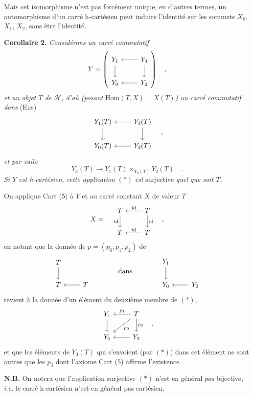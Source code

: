\documentclass[11pt]{article}
\newcommand{\printedpage}[1]{\if\relax\detokenize{#1}\relax\else\begingroup\reversemarginpar\marginnote{\footnotesize p.~#1}\endgroup\fi}
\newcommand{\msp}[1]{\marginnote{\footnotesize [#1]}}
\begin{document}
Mais cet isomorphisme n'est pas forcément unique, en d'autres termes, un automorphisme d'un carré h-cartésien peut induire l'identité sur les sommets $X_0$, $X_1$, $X_2$, sans être l'identité.

\printedpage{5}

\msp{page 6}
\textbf{Corollaire 2.} \textit{Considérons un carré commutatif}
\[
Y = \left(\begin{tikzcd}
Y_1 \ar[d] & Y_3 \ar[l] \ar[d] \\
Y_0 & Y_2 \ar[l]
\end{tikzcd}\right) \quad ,
\]
\textit{et un objet $T$ de $\mathcal{H}$, d'où (posant} $\mathrm{Hom}(T,X) = X(T)$\textit{) un carré commutatif dans} (Ens)
\[
\begin{tikzcd}
Y_1(T) \ar[d] & Y_3(T) \ar[l] \ar[d] \\
Y_0(T) & Y_2(T) \ar[l]
\end{tikzcd} \quad ,
\]
\textit{et par suite}
\[
Y_3(T) \longrightarrow Y_1(T) \times_{Y_0(T)} Y_2(T) \quad . \tag*{$(*)$}
\]
\textit{Si $Y$ est h-cartésien, cette application} $(*)$ \textit{est} surjective \textit{quel que soit $T$.}

On applique Cart (5) à $Y$ et au carré constant $X$ de valeur $T$
\[
X = \quad
\begin{tikzcd}
T \ar[d, "\mathrm{id}"'] & T \ar[l, "\mathrm{id}"'] \ar[d, "\mathrm{id}"] \\
T & T \ar[l, "\mathrm{id}"']
\end{tikzcd} \quad ,
\]
en notant que la donnée de $p = (p_0, p_1, p_2)$ de
\[
\begin{tikzcd}
T \ar[d] & \\
T & T \ar[l]
\end{tikzcd}
\qquad\qquad \text{dans} \qquad\qquad
\begin{tikzcd}
Y_1 \ar[d] & \\
Y_0 & Y_2 \ar[l]
\end{tikzcd}
\]
revient à la donnée d'un élément du deuxième membre de $(*)$,
\[
\begin{tikzcd}
Y_1 \ar[d] & T \ar[l, "p_1"'] \ar[dl, "p_0"] \ar[d, "p_2"] \\
Y_0 & Y_2 \ar[l]
\end{tikzcd} \quad ,
\]
et que les éléments de $Y_3(T)$ qui s'envoient (par $(*)$) dans cet élément ne sont autres que les $p_3$ dont l'axiome Cart (5) affirme l'existence.

\textbf{N.B.} On notera que l'application surjective $(*)$ n'est en général \textit{pas} bijective, \textit{i.e.} le carré h-cartésien n'est en général pas cartésien.
\end{document}
